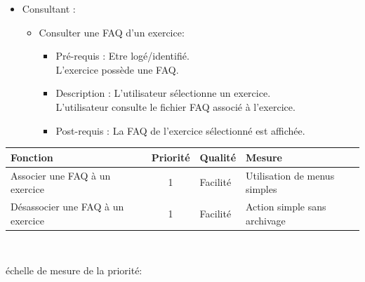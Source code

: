 	\begin{itemize}
	\item Consultant :
		\begin{itemize}
			\item Consulter une FAQ d'un exercice:
			\begin{itemize}
			\item Pr{\'e}-requis : Etre log{\'e}/identifi{\'e}.\\
			L'exercice poss{\`e}de une FAQ.
			\item Description :  L'utilisateur s{\'e}lectionne un exercice.\\
			L'utilisateur consulte le fichier FAQ associ{\'e} {\`a} l'exercice.
			\item Post-requis : La FAQ de l'exercice s{\'e}lectionn{\'e} est affich{\'e}e.
			\end{itemize}		
		\end{itemize}
	\end{itemize}
\begin{tabular}{|p{4cm}|c|p{4cm}|p{5cm}|}
\hline
Fonction & Priorit{\'e} & Qualit{\'e} & Mesure \\
\hline
Associer une FAQ {\`a} un exercice & 1 & Facilit{\'e} & Utilisation de menus simples\\
\hline
D{\'e}sassocier une FAQ {\`a} un exercice & 1 & Facilit{\'e} & Action simple sans archivage\\
\hline
\end{tabular}\\

\begin{center}
{\'e}chelle de mesure de la priorit{\'e}:

\end{center}


